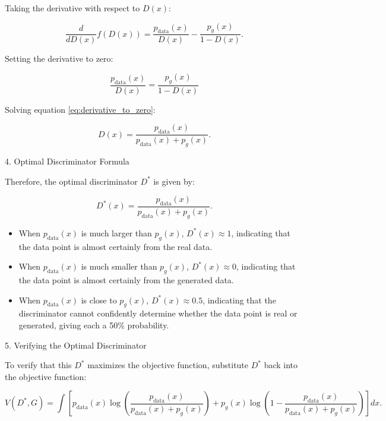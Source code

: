 Taking the derivative with respect to \( D(x) \):

\begin{equation}
    \frac{d}{dD(x)} f(D(x)) = \frac{p_{\text{data}}(x)}{D(x)} - \frac{p_g(x)}{1 - D(x)}.
\end{equation}

Setting the derivative to zero:

\begin{equation}
    \frac{p_{\text{data}}(x)}{D(x)} = \frac{p_g(x)}{1 - D(x)}
    \label{eq:derivative_to_zero}
\end{equation}

Solving equation \eqref{eq:derivative_to_zero}:

\begin{equation}
    D(x) = \frac{p_{\text{data}}(x)}{p_{\text{data}}(x) + p_g(x)}.
\end{equation}

4. Optimal Discriminator Formula

Therefore, the optimal discriminator \( D^* \) is given by:

\begin{equation}
    D^*(x) = \frac{p_{\text{data}}(x)}{p_{\text{data}}(x) + p_g(x)}.
\end{equation}


\begin{itemize}
    \item When $p_{\text{data}}(x)$ is much larger than $p_g(x)$, $D^*(x) \approx 1$, indicating that the data point is almost certainly from the real data.
    
    \item When $p_{\text{data}}(x)$ is much smaller than $p_g(x)$, $D^*(x) \approx 0$, indicating that the data point is almost certainly from the generated data.
    
    \item When $p_{\text{data}}(x)$ is close to $p_g(x)$, $D^*(x) \approx 0.5$, indicating that the discriminator cannot confidently determine whether the data point is real or generated, giving each a 50\% probability.
\end{itemize}

5. Verifying the Optimal Discriminator

To verify that this \( D^* \) maximizes the objective function, substitute \( D^* \) back into the objective function:

\begin{equation}
    V(D^*, G) = \int \left[ p_{\text{data}}(x) \log \left( \frac{p_{\text{data}}(x)}{p_{\text{data}}(x) + p_g(x)} \right) + p_g(x) \log \left( 1 - \frac{p_{\text{data}}(x)}{p_{\text{data}}(x) + p_g(x)} \right) \right] dx.
\end{equation}

